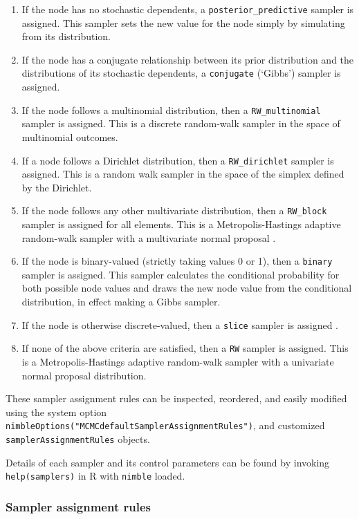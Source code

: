 \documentclass[12pt,oneside]{book}\usepackage[]{graphicx}\usepackage[]{color}
\def\cd#1{\texttt{#1}}
\begin{document}
\begin{enumerate}
\item If the node has no stochastic dependents, a \cd{posterior\_predictive} sampler is assigned.  This sampler sets the new value for the node simply by simulating from its distribution.
\item If the node has a conjugate relationship between its prior distribution and the distributions of its stochastic dependents, a \cd{conjugate} (`Gibbs') sampler is assigned.
\item If the node follows a multinomial distribution, then a \cd{RW\_multinomial} sampler is assigned.  This is a discrete random-walk sampler in the space of multinomial outcomes.
\item If a node follows a Dirichlet distribution, then a \cd{RW\_dirichlet} sampler is assigned.  This is a random walk sampler in the space of the simplex defined by the Dirichlet.
\item If the node follows any other  multivariate distribution, then a \cd{RW\_block} sampler is assigned for all elements.  This is a Metropolis-Hastings adaptive random-walk sampler with a multivariate normal proposal \citep{Roberts_Sahu_1997}.
\item If the node is binary-valued (strictly taking values 0 or 1), then a \cd{binary} sampler is assigned.  This sampler calculates the conditional probability for both possible node values and draws the new node value from the conditional distribution, in effect making a Gibbs sampler.
\item If the node is otherwise discrete-valued, then a \cd{slice} sampler is assigned \citep{Neal2003}.
\item If none of the above criteria are satisfied, then a \cd{RW} sampler is assigned.  This is a Metropolis-Hastings adaptive random-walk sampler with a univariate normal proposal distribution.
\end{enumerate}

These sampler assignment rules can be inspected, reordered, and easily modified using the system option \cd{nimbleOptions("MCMCdefaultSamplerAssignmentRules")}, and customized  \cd{samplerAssignmentRules} objects.

Details of each sampler and its control parameters can be found by invoking \cd{help(samplers)} in R with \cd{nimble} loaded.

\subsubsection{Sampler assignment rules}
\end{document}
